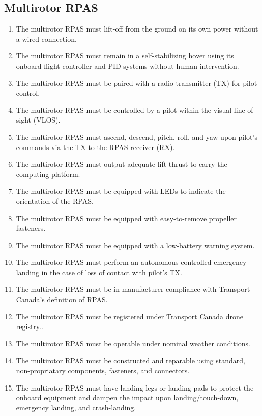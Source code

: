 \documentclass[10pt,letterpaper]{article}
\begin{document}
\subsection{Multirotor RPAS}
\begin{enumerate}[label=F.DR.\arabic*, wide=1cm, widest=3cm, leftmargin=*, font=\bfseries, noitemsep,topsep=0pt, parsep=4pt, partopsep=0pt]
	\item The multirotor RPAS must lift-off from the ground on its own power without a wired connection.
	\item The multirotor RPAS must remain in a self-stabilizing hover using its onboard flight controller and PID systems without human intervention.
	\item The multirotor RPAS must be paired with a radio transmitter (TX) for pilot control.
	\item The multirotor RPAS must be controlled by a pilot within the visual line-of-sight (VLOS).
	\item The multirotor RPAS must ascend, descend, pitch, roll, and yaw upon pilot's commands via the TX to the RPAS receiver (RX).
	\item The multirotor RPAS must output adequate lift thrust to carry the computing platform.
	\item The multirotor RPAS must be equipped with LEDs to indicate the orientation of the RPAS.
	\item The multirotor RPAS must be equipped with easy-to-remove propeller fasteners.
	\item The multirotor RPAS must be equipped with a low-battery warning system.
	\item The multirotor RPAS must perform an autonomous controlled emergency landing in the case of loss of contact with pilot's TX.
	\item The multirotor RPAS must be in manufacturer compliance with Transport Canada's definition of RPAS\cite{tp15263}.
	\item The multirotor RPAS must be registered under Transport Canada drone registry.\cite{tcdronereg}.
	\item The multirotor RPAS must be operable under nominal weather conditions.
	\item The multirotor RPAS must be constructed and reparable using standard, non-propriatary components, fasteners, and connectors.
	\item The multirotor RPAS must have landing legs or landing pads to protect the onboard equipment and dampen the impact upon landing/touch-down, emergency landing, and crash-landing.
\end{enumerate}
\end{document}
